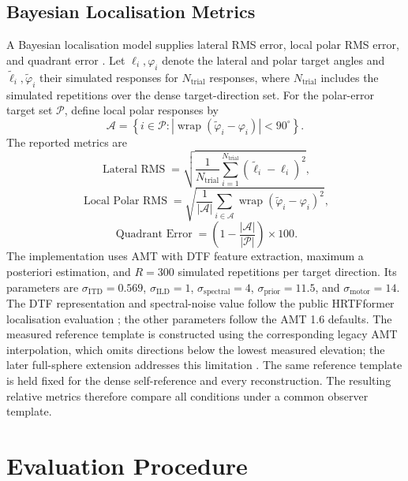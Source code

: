 \documentclass[journal]{IEEEtran}
\begin{document}
\subsection{Bayesian Localisation Metrics}
A Bayesian localisation model supplies lateral RMS error, local polar RMS error, and quadrant error \cite{Middlebrooks1999,Barumerli2023}. Let \(\ell_i,\varphi_i\) denote the lateral and polar target angles and \(\widetilde{\ell}_i,\widetilde{\varphi}_i\) their simulated responses for \(N_{\mathrm{trial}}\) responses, where \(N_{\mathrm{trial}}\) includes the simulated repetitions over the dense target-direction set. For the polar-error target set \(\mathcal{P}\), define local polar responses by
\[
\mathcal{A}=
\left\{i\in\mathcal{P}:
\left|\operatorname{wrap}(\widetilde{\varphi}_i-\varphi_i)\right|<90^\circ
\right\}.
\]
The reported metrics are
\begin{equation}
\operatorname{Lateral~RMS}=
\sqrt{\frac{1}{N_{\mathrm{trial}}}
\sum_{i=1}^{N_{\mathrm{trial}}}
(\widetilde{\ell}_i-\ell_i)^2},
\end{equation}
\begin{equation}
\operatorname{Local~Polar~RMS}=
\sqrt{\frac{1}{|\mathcal{A}|}
\sum_{i\in\mathcal{A}}
\operatorname{wrap}(\widetilde{\varphi}_i-\varphi_i)^2},
\end{equation}
\begin{equation}
\operatorname{Quadrant~Error}
=
\left(1-\frac{|\mathcal{A}|}{|\mathcal{P}|}\right)\times100.
\end{equation}
The implementation uses AMT  with DTF feature extraction, maximum a posteriori estimation, and \(R=300\) simulated repetitions per target direction. Its parameters are \(\sigma_{\mathrm{ITD}}=0.569\), \(\sigma_{\mathrm{ILD}}=1\), \(\sigma_{\mathrm{spectral}}=4\), \(\sigma_{\mathrm{prior}}=11.5\), and \(\sigma_{\mathrm{motor}}=14\). The DTF representation and spectral-noise value follow the public HRTFformer localisation evaluation \cite{Hu2026HRTFformer}; the other parameters follow the AMT 1.6  defaults. The measured reference template is constructed using the corresponding legacy AMT interpolation, which omits directions below the lowest measured elevation; the later full-sphere extension addresses this limitation \cite{Barumerli2026}. The same reference template is held fixed for the dense self-reference and every reconstruction. The resulting relative metrics therefore compare all conditions under a common observer template.

\section{Evaluation Procedure}
\end{document}
